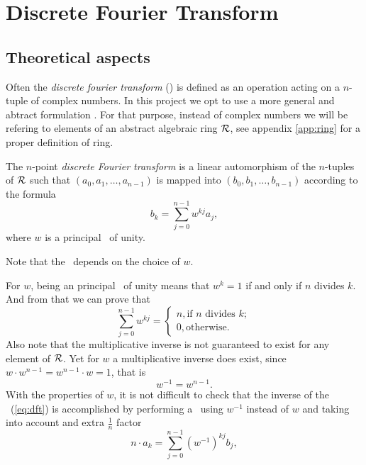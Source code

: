 \section{Discrete Fourier Transform}

\subsection{Theoretical aspects}
Often the \emph{discrete fourier transform} (\dft) is defined as an operation
acting on a $n$-tuple of complex numbers. In this project we opt to use a more
general and abtract formulation \cite{furer07}. For that purpose, instead of complex numbers we
will be refering to elements of an abstract algebraic ring $\mathcal{R}$, see appendix
\ref{app:ring} for a proper definition of ring. 
\begin{definition}
    The $n$-point \emph{discrete Fourier transform} is a linear
    automorphism of the $n$-tuples of $\mathcal{R}$ such that $(a_0,a_1,\ldots,a_{n-1})$
    is mapped into $(b_0,b_1,\ldots,b_{n-1})$ according to the formula 
    \begin{equation} 
        b_k = \sum_{j=0}^{n-1} w^{kj} a_j,
        \label{eq:dft}
    \end{equation}
    where $w$ is a principal \ of unity.
    \label{def:dft}
\end{definition}
Note that the \dft\ depends on the choice of $w$.

For $w$, being an principal \ of unity means that $w^k=1$ if and only if $n$
divides $k$. And from that we can prove that
\begin{equation}
    \sum_{j=0}^{n-1} w^{kj} = 
    \begin{cases} 
        n,\text{if $n$ divides $k$};\\ 
        0, \text{otherwise}.
    \end{cases}
\end{equation}
Also note that the multiplicative inverse is not guaranteed to exist for any
element of $\mathcal{R}$. Yet for $w$ a multiplicative inverse does exist, since
$w \cdot w^{n-1} =  w^{n-1} \cdot w = 1$, that is
\begin{equation}
    w^{-1} = w^{n-1}.
\end{equation}
With the properties of $w$, it is not difficult to check that the inverse of the
\dft\ (\ref{eq:dft}) is accomplished by performing a \dft\ using $w^{-1}$
instead of $w$ and taking into account and extra $\frac{1}{n}$ factor
\begin{equation} 
    n \cdot a_k = \sum_{j=0}^{n-1} (w^{-1})^{kj} b_j,
    \label{eq:inv_dft}
\end{equation}


